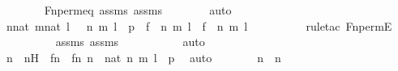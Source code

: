 \begin{isabellebody}
\ \ \ \ \ \ \isamarkupfalse%
\ Fn{\isacharunderscore}{\kern0pt}perm{\isacharprime}{\kern0pt}{\isacharunderscore}{\kern0pt}eq\ assms\ assms{}\isanewline
\ \ \ \ \ \ \isamarkupfalse%
\ auto\ \isanewline
\ \ \ \ \isamarkupfalse%
\ \isamarkupfalse%
\ {\isachardoublequoteopen}{\isasymexists}n{\isacharprime}{\kern0pt}{\isasymin}nat{\isachardot}{\kern0pt}\ {\isasymexists}m{\isacharprime}{\kern0pt}{\isasymin}nat{\isachardot}{\kern0pt}\ {\isasymexists}l{\isacharprime}{\kern0pt}\ {\isasymin}\ {}{\isachardot}{\kern0pt}\ {\isasymlangle}{\isasymlangle}n{\isacharprime}{\kern0pt}{\isacharcomma}{\kern0pt}\ m{\isacharprime}{\kern0pt}{\isasymrangle}{\isacharcomma}{\kern0pt}\ l{\isacharprime}{\kern0pt}{\isasymrangle}\ {\isasymin}\ p\ {\isasymand}\ {\isasymlangle}{\isasymlangle}f\ {\isacharbackquote}{\kern0pt}\ n{\isacharcomma}{\kern0pt}\ m{\isasymrangle}{\isacharcomma}{\kern0pt}\ l{\isasymrangle}\ {\isacharequal}{\kern0pt}\ {\isasymlangle}{\isasymlangle}f\ {\isacharbackquote}{\kern0pt}\ n{\isacharprime}{\kern0pt}{\isacharcomma}{\kern0pt}\ m{\isacharprime}{\kern0pt}{\isasymrangle}{\isacharcomma}{\kern0pt}\ l{\isacharprime}{\kern0pt}{\isasymrangle}{\isachardoublequoteclose}\ \isanewline
\ \ \ \ \ \ \ \ \isamarkupfalse%
{\isacharparenleft}{\kern0pt}rule{\isacharunderscore}{\kern0pt}tac\ Fn{\isacharunderscore}{\kern0pt}permE{\isacharparenright}{\kern0pt}\isanewline
\ \ \ \ \ \ \ \ \isamarkupfalse%
\ assms{}\ assms\ \isanewline
\ \ \ \ \ \ \ \ \isamarkupfalse%
\ auto\isanewline
\ \ \ \ \isamarkupfalse%
\ \isamarkupfalse%
\ n{\isacharprime}{\kern0pt}\ \ n{\isacharprime}{\kern0pt}H\ {\isacharcolon}{\kern0pt}\ {\isachardoublequoteopen}f{\isacharbackquote}{\kern0pt}n\ {\isacharequal}{\kern0pt}\ f{\isacharbackquote}{\kern0pt}n{\isacharprime}{\kern0pt}{\isachardoublequoteclose}\ {\isachardoublequoteopen}n{\isacharprime}{\kern0pt}\ {\isasymin}\ nat{\isachardoublequoteclose}\ {\isachardoublequoteopen}{\isacharless}{\kern0pt}{\isacharless}{\kern0pt}n{\isacharprime}{\kern0pt}{\isacharcomma}{\kern0pt}\ m{\isachargreater}{\kern0pt}{\isacharcomma}{\kern0pt}\ l{\isachargreater}{\kern0pt}\ {\isasymin}\ p{\isachardoublequoteclose}\ \isamarkupfalse%
\ auto\isanewline
\ \ \ \ \isamarkupfalse%
\ \isamarkupfalse%
\ {\isachardoublequoteopen}n\ {\isacharequal}{\kern0pt}\ n{\isacharprime}{\kern0pt}{\isachardoublequoteclose}\ \isamarkupfalse%

\end{isabellebody}
